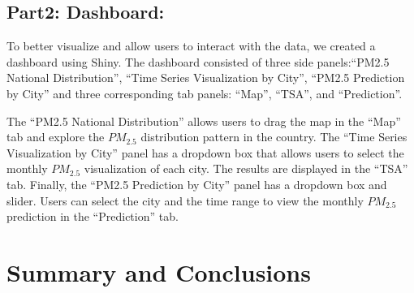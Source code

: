 \documentclass[
  12pt,
]{article}
\begin{document}
\newpage

\hypertarget{part2-dashboard}{%
\subsection{Part2: Dashboard:}\label{part2-dashboard}}

To better visualize and allow users to interact with the data, we
created a dashboard using Shiny. The dashboard consisted of three side
panels:``PM2.5 National Distribution'', ``Time Series Visualization by
City'', ``PM2.5 Prediction by City'' and three corresponding tab panels:
``Map'', ``TSA'', and ``Prediction''.

The ``PM2.5 National Distribution'' allows users to drag the map in the
``Map'' tab and explore the \(PM_{2.5}\) distribution pattern in the
country. The ``Time Series Visualization by City'' panel has a dropdown
box that allows users to select the monthly \(PM_{2.5}\) visualization
of each city. The results are displayed in the ``TSA'' tab. Finally, the
``PM2.5 Prediction by City'' panel has a dropdown box and slider. Users
can select the city and the time range to view the monthly \(PM_{2.5}\)
prediction in the ``Prediction'' tab.

\newpage

\hypertarget{summary-and-conclusions}{%
\section{Summary and Conclusions}\label{summary-and-conclusions}}
\end{document}
